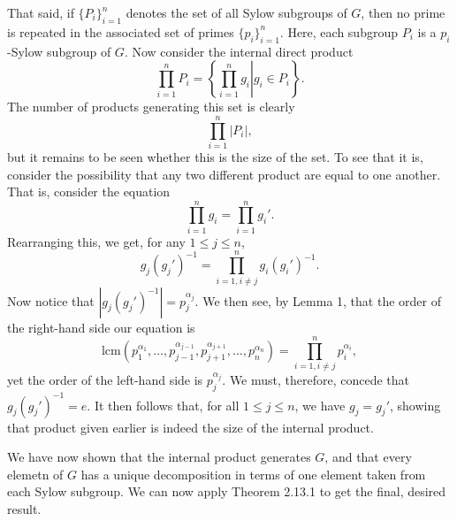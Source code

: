 \documentclass[12pt]{article}
\newcommand{\lcm}{\mbox{lcm}}
\begin{document}
That said, if $\{P_i\}_{i=1}^n$ denotes the set of all Sylow subgroups of $G$,
then no prime is repeated in the associated set of primes $\{p_i\}_{i=1}^n$.
Here, each subgroup $P_i$ is a $p_i$-Sylow subgroup of $G$.
Now consider the internal direct product
\begin{equation*}
\prod_{i=1}^n P_i = \left\{\left.\prod_{i=1}^n g_i\right|g_i\in P_i\right\}.
\end{equation*}
The number of products generating this set is clearly
\begin{equation*}
\prod_{i=1}^n |P_i|,
\end{equation*}
but it remains to be seen whether this is the size of the set.  To see that
it is, consider the possibility that any two different product are equal to one another.
That is, consider the equation
\begin{equation*}
\prod_{i=1}^n g_i = \prod_{i=1}^n g_i'.
\end{equation*}
Rearranging this, we get, for any $1\leq j\leq n$,
\begin{equation*}
g_j(g_j')^{-1} = \prod_{i=1,i\neq j}^n g_i(g_i')^{-1}.
\end{equation*}
Now notice that $|g_j(g_j')^{-1}|=p_j^{\alpha_j}$.  We then see, by Lemma 1, that the
order of the right-hand side our equation is
\begin{equation*}
\lcm(p_1^{\alpha_1},\dots,p_{j-1}^{\alpha_{j-1}},p_{j+1}^{\alpha_{j+1}},\dots,p_n^{\alpha_n}) = \prod_{i=1,i\neq j}^n p_i^{\alpha_i},
\end{equation*}
yet the order of the left-hand side is $p_j^{\alpha_j}$.  We must, therefore, concede that $g_j(g_j')^{-1}=e$.
It then follows that, for all $1\leq j\leq n$, we have $g_j=g_j'$, showing that product given earlier is indeed
the size of the internal product.

We have now shown that the internal product generates $G$, and that every elemetn of $G$ has a
unique decomposition in terms of one element taken from each Sylow subgroup.  We can now apply
Theorem 2.13.1 to get the final, desired result.
\end{document}

